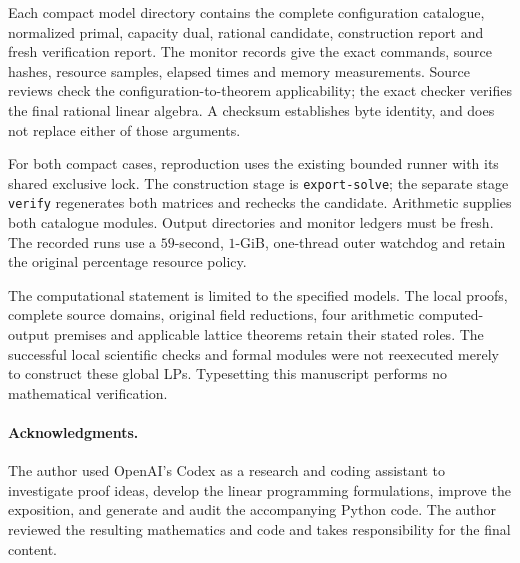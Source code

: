 \documentclass[11pt]{article}
\theoremstyle{definition}
\theoremstyle{remark}
\numberwithin{equation}{section}
\begin{document}
Each compact model directory contains the complete configuration
catalogue, normalized primal, capacity dual, rational candidate,
construction report and fresh verification report. The monitor
records give the exact commands, source hashes, resource samples,
elapsed times and memory measurements. Source reviews check the
configuration-to-theorem applicability; the exact checker verifies
the final rational linear algebra. A checksum establishes byte
identity, and does not replace either of those arguments.

For both compact cases, reproduction uses the existing bounded runner
with its shared exclusive lock. The construction stage is
\texttt{export-solve}; the separate stage \texttt{verify} regenerates
both matrices and rechecks the candidate. Arithmetic supplies both
catalogue modules. Output directories and monitor ledgers must be
fresh. The recorded runs use a $59$-second, $1$-GiB, one-thread outer
watchdog and retain the original percentage resource policy.

The computational statement is limited to the specified models.
The local proofs, complete source domains, original field reductions,
four arithmetic computed-output premises and applicable lattice
theorems retain their stated roles. The successful local scientific
checks and formal modules were not reexecuted merely to construct
these global LPs. Typesetting this manuscript performs no
mathematical verification.

\paragraph{Acknowledgments.}
The author used OpenAI's Codex as a research and coding assistant to
investigate proof ideas, develop the linear programming formulations,
improve the exposition, and generate and audit the accompanying Python
code. The author reviewed the resulting mathematics and code and takes
responsibility for the final content.
\end{document}
